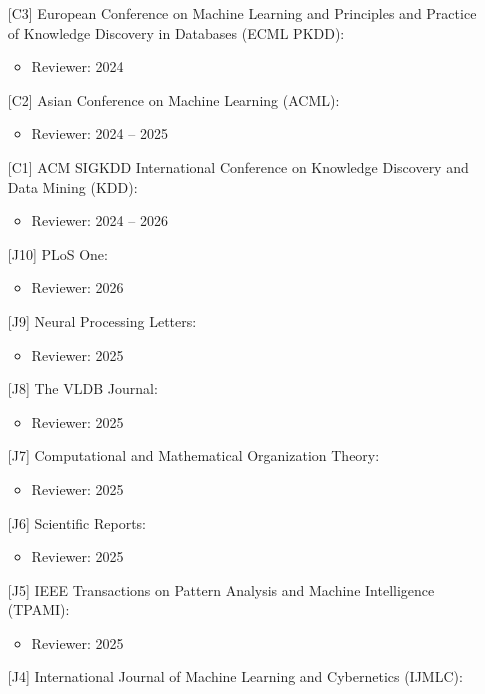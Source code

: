 \documentclass{resume}
\begin{document}
\begin{itemize}[parsep=0.5ex]
\begin{itemize}
\end{itemize}
\item [{[C3]}] European Conference on Machine Learning and Principles and Practice of Knowledge Discovery in Databases (ECML PKDD):
\begin{itemize}
    \item Reviewer: 2024
\end{itemize}
\item [{[C2]}] Asian Conference on Machine Learning (ACML): 
\begin{itemize}
    \item Reviewer: 2024 -- 2025
\end{itemize}
\item [{[C1]}] ACM SIGKDD International Conference on Knowledge Discovery and Data Mining (KDD):
\begin{itemize}
    \item Reviewer: 2024 -- 2026
\end{itemize}
\item [{[J10]}] PLoS One:
\begin{itemize}
    \item Reviewer: 2026
\end{itemize}
\item [{[J9]}] Neural Processing Letters:
\begin{itemize}
    \item Reviewer: 2025
\end{itemize}
\item [{[J8]}] The VLDB Journal:
\begin{itemize}
    \item Reviewer: 2025
\end{itemize}
\item [{[J7]}] Computational and Mathematical Organization Theory:
\begin{itemize}
    \item Reviewer: 2025
\end{itemize}
\item [{[J6]}] Scientific Reports:
\begin{itemize}
    \item Reviewer: 2025
\end{itemize}
\item [{[J5]}] IEEE Transactions on Pattern Analysis and Machine Intelligence (TPAMI):
\begin{itemize}
    \item Reviewer: 2025
\end{itemize}
\item [{[J4]}] International Journal of Machine Learning and Cybernetics (IJMLC):

\end{itemize}
\end{document}

